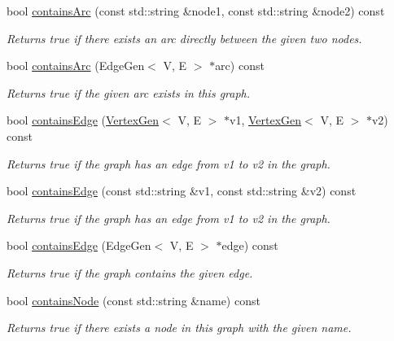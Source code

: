 \begin{DoxyCompactItemize}
bool \mbox{\hyperlink{classGraph_a515e45aae316b581bf1cf168541f4f44}{contains\+Arc}} (const std\+::string \&node1, const std\+::string \&node2) const
\begin{DoxyCompactList}\small\item\em Returns true if there exists an arc directly between the given two nodes. \end{DoxyCompactList}\item 
bool \mbox{\hyperlink{classGraph_acf7a659ddd8a143836b91b01c200ee8a}{contains\+Arc}} (Edge\+Gen$<$ V, E $>$ $\ast$arc) const
\begin{DoxyCompactList}\small\item\em Returns true if the given arc exists in this graph. \end{DoxyCompactList}\item 
bool \mbox{\hyperlink{classBasicGraphGen_a6ce3804a90bf7006e7bc78e1a51a1365}{contains\+Edge}} (\mbox{\hyperlink{classVertexGen}{Vertex\+Gen}}$<$ V, E $>$ $\ast$v1, \mbox{\hyperlink{classVertexGen}{Vertex\+Gen}}$<$ V, E $>$ $\ast$v2) const
\begin{DoxyCompactList}\small\item\em Returns true if the graph has an edge from v1 to v2 in the graph. \end{DoxyCompactList}\item 
bool \mbox{\hyperlink{classBasicGraphGen_a4475808d2ed8a45b9fceecc2c6081fc3}{contains\+Edge}} (const std\+::string \&v1, const std\+::string \&v2) const
\begin{DoxyCompactList}\small\item\em Returns true if the graph has an edge from v1 to v2 in the graph. \end{DoxyCompactList}\item 
bool \mbox{\hyperlink{classBasicGraphGen_ad41e772ab382972e1c54ab6df781dd82}{contains\+Edge}} (Edge\+Gen$<$ V, E $>$ $\ast$edge) const
\begin{DoxyCompactList}\small\item\em Returns true if the graph contains the given edge. \end{DoxyCompactList}\item 
bool \mbox{\hyperlink{classGraph_ac0beb77e8a238c2898ab851df71eeefe}{contains\+Node}} (const std\+::string \&name) const
\begin{DoxyCompactList}\small\item\em Returns true if there exists a node in this graph with the given name. \end{DoxyCompactList}\item 

\end{DoxyCompactItemize}
